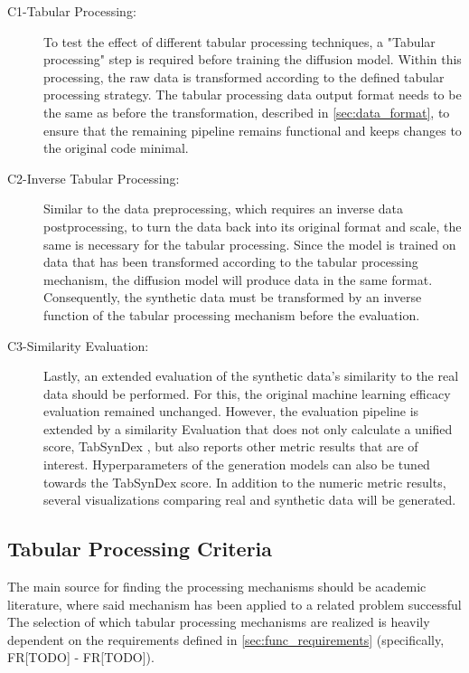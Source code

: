 \begin{description}
    \item[C1-Tabular Processing:] To test the effect of different tabular processing techniques, a "Tabular processing" step is required before training the diffusion model.
    Within this processing, the raw data is transformed according to the defined tabular processing strategy.
    The tabular processing data output format needs to be the same as before the transformation, described in \autoref{sec:data_format}, to ensure 
    that the remaining pipeline remains functional and keeps changes to the original code minimal.
    \item[C2-Inverse Tabular Processing:] Similar to the data preprocessing, which requires an inverse data postprocessing, to turn the data back into its original format and scale, the same is necessary for the tabular processing.
    Since the model is trained on data that has been transformed according to the tabular processing mechanism, the diffusion model will produce data in the same format.
    Consequently, the synthetic data must be transformed by an inverse function of the tabular processing mechanism before the evaluation.
    \item[C3-Similarity Evaluation:] Lastly, an extended evaluation of the synthetic data's similarity to the real data should be performed.
    For this, the original machine learning efficacy evaluation remained unchanged.
    However, the evaluation pipeline is extended by a similarity Evaluation that does not only calculate a unified score, TabSynDex \cite{chundawat2022UniversalMetricRobust}, but also reports other metric results that are of interest.
    Hyperparameters of the generation models can also be tuned towards the TabSynDex score.
    In addition to the numeric metric results, several visualizations comparing real and synthetic data will be generated.
\end{description}

\subsection{Tabular Processing Criteria}
\label{ch:Concept-criteria}

The main source for finding the processing mechanisms should be academic literature, where said mechanism has been applied to a related problem successful
The selection of which tabular processing mechanisms are realized is heavily dependent on the requirements defined in \autoref{sec:func_requirements} (specifically, FR[TODO] - FR[TODO]).

